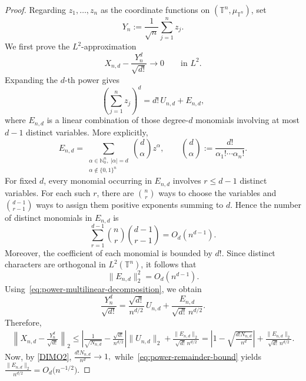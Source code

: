 \documentclass[11pt,showkeys]{amsart}
\begin{document}
\begin{proof}
Regarding \(z_1,\ldots,z_n\) as the coordinate functions on
\((\mathbb T^n,\mu_{\mathbb T^n})\), set
\[
    Y_n:=\frac{1}{\sqrt n}\sum_{j=1}^n z_j.
\]
We first prove the \(L^2\)-approximation
\[
    X_{n,d}-\frac{Y_n^d}{\sqrt{d!}}
    \longrightarrow 0
    \qquad\text{in }L^2.
\]
Expanding the \(d\)-th power gives
\begin{equation}
\label{eq:power-multilinear-decomposition}
    \left(\sum_{j=1}^n z_j\right)^d
    =
    d!\,U_{n,d}+E_{n,d},
\end{equation}
where \(E_{n,d}\) is a linear combination of those degree-\(d\)
monomials involving at most \(d-1\) distinct variables. More explicitly,
\[
    E_{n,d}
    =
    \sum_{\substack{\alpha\in\mathbb N_0^n,\ |\alpha|=d\\
                    \alpha\notin\{0,1\}^n}}
    \binom{d}{\alpha}z^\alpha,
    \qquad
    \binom d\alpha
    :=
    \frac{d!}{\alpha_1!\cdots\alpha_n!}.
\]
For fixed \(d\), every monomial occurring in \(E_{n,d}\) involves
\(r\leq d-1\) distinct variables. For each such \(r\), there are
\(\binom nr\) ways to choose the variables and
\(\binom{d-1}{r-1}\) ways to assign them positive exponents summing to
\(d\). Hence the number of distinct monomials in \(E_{n,d}\) is
\[
    \sum_{r=1}^{d-1}
    \binom nr\binom{d-1}{r-1}
    =
    O_d(n^{d-1}).
\] Moreover,  the  coefficient of each monomial is bounded by \(d!\).
Since distinct characters are orthogonal in \(L^2(\mathbb T^n)\), it
follows that
\begin{equation}
\label{eq:power-remainder-bound}
    \|E_{n,d}\|_2^2
    =
    O_d(n^{d-1}).
\end{equation}
Using~\eqref{eq:power-multilinear-decomposition}, we obtain
\[
    \frac{Y_n^d}{\sqrt{d!}}
    =
    \frac{\sqrt{d!}}{n^{d/2}}\,U_{n,d}
    +
    \frac{E_{n,d}}{\sqrt{d!}\,n^{d/2}}.
\]
Therefore,
\begin{align*}
    \left\|
        X_{n,d}-\frac{Y_n^d}{\sqrt{d!}}
    \right\|_2
    \leq
    \left|
        \frac{1}{\sqrt{N_{n,d}}}
        -
        \frac{\sqrt{d!}}{n^{d/2}}
    \right|
    \|U_{n,d}\|_2
    +
    \frac{\|E_{n,d}\|_2}{\sqrt{d!}\,n^{d/2}}
=
    \left|
        1-\sqrt{\frac{d!N_{n,d}}{n^d}}
    \right|
    +
    \frac{\|E_{n,d}\|_2}{\sqrt{d!}\,n^{d/2}}.
\end{align*}
Now, by \eqref{DIMO2},
\(
    \frac{d!N_{n,d}}{n^d}
    \longrightarrow 1,
\)
while~\eqref{eq:power-remainder-bound} yields
\(
    \frac{\|E_{n,d}\|_2}{n^{d/2}}
    =
    O_d\bigl(n^{-1/2}\bigr).
\)

\end{proof}
\end{document}
